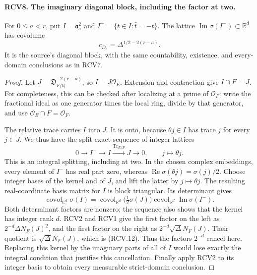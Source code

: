\paragraph{RCV8. The imaginary diagonal block, including the factor at two.}
\label{claim:RCV8}
For \(0\leq a<r\), put
\(I=\mathfrak a_a^2\) and
\(I^- =\{t\in I:\bar t=-t\}\).  The lattice
\(\operatorname{Im}\sigma(I^-)\subset\mathbb R^d\) has covolume
\[
                  c_{D_a}=\Delta^{1/2-2(r-a)}.
\tag{RCV.12}
\]
It is the source's diagonal block, with the same countability,
existence, and every-domain conclusions as in RCV7.
\begin{proof}
Let \(J=\mathfrak D_{F/\mathbb Q}^{-2(r-a)}\), so
\(I=J\mathcal O_E\).  Extension and contraction give
\(I\cap F=J\).  For completeness, this can be checked after
localizing at a prime of \(\mathcal O_F\): write the fractional
ideal as one generator times the local ring, divide by that
generator, and use \(\mathcal O_E\cap F=\mathcal O_F\).

The relative trace carries \(I\) into \(J\).  It is onto,
because \(\theta j\in I\) has trace \(j\) for every \(j\in J\).
We thus have the split exact sequence of integer lattices
\[
 0\longrightarrow I^-\longrightarrow I
       \xrightarrow{\operatorname{Tr}_{E/F}}J\longrightarrow0,
 \qquad j\longmapsto\theta j.
\tag{RCV.13}
\]
This is an integral splitting, including at two.  In the chosen
complex embeddings, every element of \(I^-\) has real part zero,
whereas \(\operatorname{Re}\sigma(\theta j)=\sigma(j)/2\).
Choose integer bases of the kernel and of \(J\), and lift the
latter by \(j\mapsto\theta j\).  The resulting real-coordinate
basis matrix for \(I\) is block triangular.  Its determinant gives
\[
 \operatorname{covol}_{\mathbb C^d}\sigma(I)
 =\operatorname{covol}_{\mathbb R^d}\big(\tfrac12\sigma(J)\big)
       \operatorname{covol}_{\mathbb R^d}\operatorname{Im}\sigma(I^-).
\tag{RCV.14}
\]
Both determinant factors are nonzero; the sequence also shows that
the kernel has integer rank \(d\).  RCV2 and RCV1 give the first
factor on the left as \(2^{-d}\Delta N_F(J)^2\), and the
first factor on the right as \(2^{-d}\sqrt\Delta N_F(J)\).
Their quotient is \(\sqrt\Delta N_F(J)\), which is (RCV.12).
Thus the factors \(2^{-d}\) cancel here.  Replacing this kernel
by the imaginary parts of all of \(I\) would lose exactly the
integral condition that justifies this cancellation.
Finally apply RCV2 to its integer basis to obtain every measurable
strict-domain conclusion.
\end{proof}

